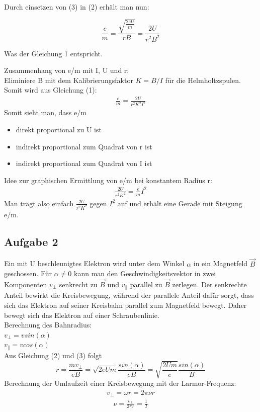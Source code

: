 \documentclass[a4paper,10pt]{scrartcl}
\begin{document}
	Durch einsetzen von (3) in (2) erhält man nun:
	
	\begin{equation}
	\frac{e}{m}=\frac{\sqrt{\frac{2eU}{m}}}{rB}=\frac{2U}{r^2B^2}
	\end{equation}
	
	Was der Gleichung 1 entspricht.
	
	\newpage
	
	Zusammenhang von e/m mit I, U und r:\\
	Eliminiere B mit dem Kalibrierungsfaktor $K=B/I$ für die Helmholtzspulen. Somit wird aus Gleichung (1):
	\begin{align}
	\frac{e}{m}=\frac{2U}{r^2K^2I^2}
	\end{align}
	Somit sieht man, dass e/m
	\begin{itemize}
		\item direkt proportional zu U ist
		\item indirekt proportional zum Quadrat von r ist
		\item indirekt proportional zum Quadrat von I ist
	\end{itemize}

	Idee zur graphischen Ermittlung von e/m bei konstantem Radius r:\\
	\begin{align*}
	\frac{2U}{r^2K^2}=\frac{e}{m}I^2
	\end{align*}
	Man trägt also einfach $\frac{2U}{r^2K^2}$ gegen $I^2$ auf und erhält eine Gerade mit Steigung e/m.
	
	\subsection{Aufgabe 2}
	
	Ein mit U beschleunigtes Elektron wird unter dem Winkel $\alpha$
	in ein Magnetfeld $\vec{B}$ geschossen. Für $\alpha\neq0$ kann man den Geschwindigkeitsvektor in zwei Komponenten $v_{\perp}$ senkrecht zu $\vec{B}$ und $v_{\parallel}$ parallel zu $\vec{B}$ zerlegen. Der senkrechte Anteil bewirkt die Kreisbewegung, während der parallele Anteil dafür sorgt, dass sich das Elektron auf seiner Kreisbahn parallel zum Magnetfeld bewegt. Daher bewegt sich das Elektron auf einer Schraubenlinie.\\
	Berechnung des Bahnradius:\\
	$v_{\perp}=vsin(\alpha)$\\
	$v_{\parallel}=vcos(\alpha)$\\
	Aus Gleichung (2) und (3) folgt
	\begin{equation}
	r=\frac{mv_{\perp}}{eB}=\sqrt{2eUm}\frac{sin(\alpha)}{eB}=\sqrt{\frac{2Um}{e}}\frac{sin(\alpha)}{B}
	\end{equation}
	Berechnung der Umlaufzeit einer Kreisbewegung mit der Larmor-Frequenz:
	\begin{align*}
	v_{\perp}=\omega r=2\pi \nu r
	\end{align*}
	\begin{align*}
	\nu=\frac{v_{\perp}}{2\pi r}=\frac{1}{T}
	\end{align*}
	
\end{document}
